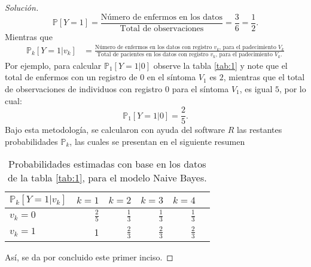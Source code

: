\documentclass[10.5pt,notitlepage]{article}
\newenvironment{solucion}
  {\begin{proof}[Solución]}
  {\end{proof}}
\newcommand{\PP}{\mathbb{P}}
\theoremstyle{plain}
\begin{document}
\begin{solucion}
\[
\PP[Y = 1] = \frac{\text{Número de enfermos en los datos}}{\text{Total de observaciones} } = \frac{3}{6} = \frac{1}{2}.
\]
Mientras que 
\begin{align*}
    \PP_{k}[Y = 1 | v_k] &= \frac{\text{Número de enfermos en los datos con registro \(v_k\), para el padecimiento \(V_k\)}}{\text{Total de pacientes en los datos con registro \(v_k\), para el padecimiento \(V_k\).}}
\end{align*}
Por ejemplo, para calcular \(\PP_{1}[Y = 1 | 0] \) observe la tabla \ref{tab:1} y note que el total de enfermos con un registro de \(0\) en el síntoma \(V_1\) es \(2\), mientras que el total de observaciones de individuos con registro \(0\) para el síntoma \(V_1\), es igual \(5\), por lo cual: 
\[
 \PP_{1}[Y = 1 | 0] = \frac{2}{5}. 
\]
Bajo esta metodología, se calcularon con ayuda del software \(R\) las restantes probabilidades \(\PP_{k}\), las cuales se presentan en el siguiente resumen
\begin{table}[H]
        \centering
        \begin{tabular}{@{}l@{\hskip 0.3in}|r@{\hskip 0.3in}r@{\hskip 0.3in}r@{\hskip 0.3in}r@{\hskip 0.3in}r@{}}
            \toprule
             \(\PP_{k}[Y = 1|v_{k}]\)& \(k=1\) & \(k=2\)& \(k=3\)& \(k = 4\)&\\ 
            \midrule
            \(v_k =0\) &\(\frac{2}{5}\) & \(\frac{1}{3}\)& \(\frac{1}{3}\) & \(\frac{1}{3}\)\\
            \(v_k =1\) &1&\(\frac{2}{3}\)&\(\frac{2}{3}\)&\(\frac{2}{3}\)\\
            \bottomrule
        \end{tabular}
        \caption{Probabilidades estimadas con base en los datos de la tabla \ref{tab:1}, para el modelo Naive Bayes.}
        \label{tab:2}
\end{table}
Así, se da por concluido este primer inciso. 

\end{solucion}
\end{document}
